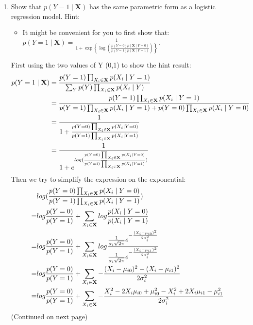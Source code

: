 \documentclass[11pt]{article}
\renewcommand{\vec}[1]{\mathbf{#1}}
\begin{document}
\begin{enumerate}
\item Show that $p(Y = 1 \mid \vec{X})$ has the same parametric form as a logistic regression model.
Hint:
\begin{itemize}
\item It might be convenient for you to first show that:
$p(Y = 1 \mid \vec{X}) = \frac{1}{1 + \exp\left\{ \log \left( \frac{ p(Y=0) p(\vec{X} \mid Y=0) }{ p(Y=1) p(\vec{X} \mid Y=1) } \right) \right\}}$.
\end{itemize}

\begin{answertext}{15cm}{}
First using the two values of Y (0,1) to show the hint result:
\begin{align}
p(Y=1 \mid \vec{X}) &=
\frac{
p(Y=1) \prod_{X_i \in \vec{X}} p(X_i \mid Y=1)
}{
\sum_Y p(Y) \prod_{X_i \in \vec{X}} p(X_i \mid Y)
} \notag\\
&=\frac{
p(Y=1) \prod_{X_i \in \vec{X}} p(X_i \mid Y=1)
}{
p(Y=1) \prod_{X_i \in \vec{X}} p(X_i \mid Y=1) + p(Y=0) \prod_{X_i \in \vec{X}} p(X_i \mid Y=0)
} \notag\\
&=\frac{1}{1+ \frac{p(Y=0) \prod_{X_i \in \vec{X}} p(X_i \mid Y=0)}{p(Y=1) \prod_{X_i \in \vec{X}} p(X_i \mid Y=1)}} \notag \\
&=\frac{1}{1+ e^{log(\frac{p(Y=0) \prod_{X_i \in \vec{X}} p(X_i \mid Y=0)}{p(Y=1) \prod_{X_i \in \vec{X}} p(X_i \mid Y=1)})}} \notag
\end{align}
Then we try to simplify the expression on the exponential:
\begin{align}
&log(\frac{p(Y=0) \prod_{X_i \in \vec{X}} p(X_i \mid Y=0)}{p(Y=1) \prod_{X_i \in \vec{X}} p(X_i \mid Y=1)}) \notag\\
=& log\frac{p(Y=0)}{p(Y=1)} + \sum_{X_i \in \vec{X}}log\frac{p(X_i \mid Y=0)}{p(X_i \mid Y=1)} \notag \\
=& log\frac{p(Y=0)}{p(Y=1)} + \sum_{X_i \in \vec{X}}log\frac{\frac{1}{\sigma_{i}\sqrt{2 \pi}}e^{-\frac{(X_i - \mu_{i0})^2}{2\sigma_{i}^2}}}{\frac{1}{\sigma_{i}\sqrt{2 \pi}}e^{-\frac{(X_i - \mu_{i1})^2}{2\sigma_{i}^2}}} \notag \\
=& log\frac{p(Y=0)}{p(Y=1)} + \sum_{X_i \in \vec{X}}-\frac{(X_i - \mu_{i0})^2 - (X_i - \mu_{i1})^2}{2\sigma_{i}^2}\notag \\
=& log\frac{p(Y=0)}{p(Y=1)} + \sum_{X_i \in \vec{X}}-\frac{X_i^2 - 2 X_i \mu_{i0} + \mu_{i0}^2 - X_i^2 + 2 X_i \mu_{i1} - \mu_{i1}^2}{2\sigma_{i}^2}\notag 
\end{align}
(Continued on next page)

\end{answertext}
\end{enumerate}
\end{document}
